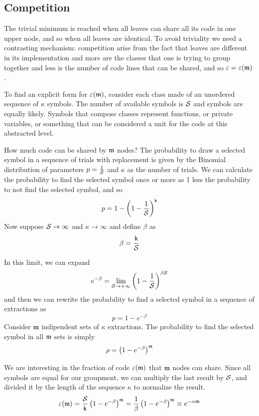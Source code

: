 \subsection{Competition}
The trivial minimum is reached when all leaves can share all its code in one upper node, and so when all leaves are identical. To avoid triviality we need a contrasting mechanism: competition arise from the fact that leaves are different in its implementation and more are the classes that one is trying to group together and less is the number of code lines that can be shared, and so $\varepsilon = \varepsilon (\mathfrak m)$.

To find an explicit form for $\varepsilon (\mathfrak m)$, consider each class made of an unordered sequence of $\kappa$ symbols. The number of available symbols is $\mathcal S$ and symbols are equally likely. Symbols that compose classes represent functions, or private variables, or something that can be considered a unit for the code at this abstracted level.

How much code can be shared by $\mathfrak m$ nodes? The probability to draw a selected symbol in a sequence of trials with replacement is given by the Binomial distribution of parameters $p = \frac{1}{\mathcal S}$ and $\kappa$ as the number of trials. We can calculate the probability to find the selected symbol once or more as 1 less the probability to not find the selected symbol, and so
\[ p = 1 - \left ( 1 -\frac{1}{\mathcal S} \right )^\mathsf k \]
Now suppose $\mathcal S \to \infty$ and $\kappa \to \infty$ and define $\beta$ as
\[ \beta= \frac{\mathsf k}{\mathcal S} \]

In this limit, we can expand
\[ e^{-\beta}= \lim_{\mathcal S \to +\infty} \left( 1 - \frac{1}{\mathcal S} \right)^{\beta \mathcal S} \]
and then we can rewrite the probability to find a selected symbol in a sequence of extractions as
\[ p = 1 - e^{-\beta} \]
Consider $\mathfrak m$ indipendent sets of $\kappa$ extractions. The probability to find the selected symbol in all $\mathfrak m$ sets is simply 
\[ \rho = \left(1 - e^{-\beta}\right)^{\mathfrak m} \]

We are interesting in the fraction of code $\varepsilon (\mathfrak m)$ that $\mathfrak m$ nodes can share. Since all symbols are equal for our groupment, we can multiply the last result by $\mathcal S$, and divided it by the length of the sequence $\kappa$ to normalize the result.
\[ \varepsilon (\mathfrak m) = \frac{\mathcal S}{\mathsf k} \left(1 - e^{-\beta}\right)^{\mathfrak m} = \frac{1}{\beta} \left(1 - e^{-\beta}\right)^{\mathfrak m} \equiv e^{-\alpha \mathfrak m}\]

